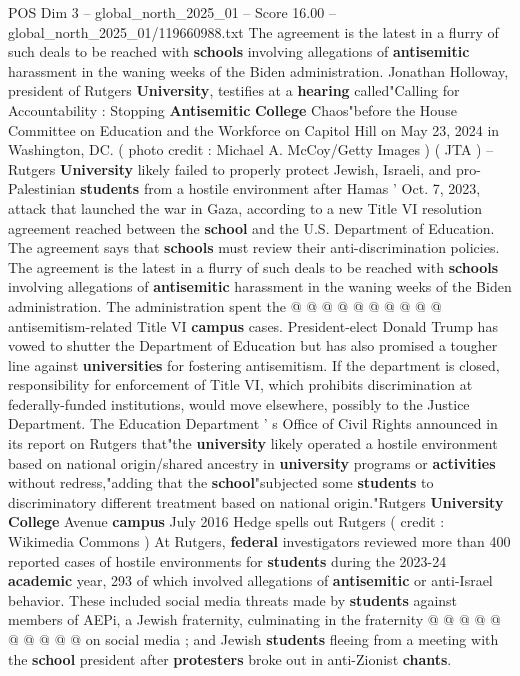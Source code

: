\begin{textsample}{POS Dim 3 – global\_north\_2025\_01 – Score 16.00 – global\_north\_2025\_01/119660988.txt}  \label{ex:f3_pos_244}
The agreement is the latest in a flurry of such deals to be reached with \textbf{schools} involving allegations of \textbf{antisemitic} harassment in the waning weeks of the Biden administration.
Jonathan Holloway, president of Rutgers \textbf{University}, testifies at a \textbf{hearing} called"Calling for Accountability : Stopping \textbf{Antisemitic} \textbf{College} Chaos"before the House Committee on Education and the Workforce on Capitol Hill on May 23, 2024 in Washington, DC. ( photo credit : Michael A.
McCoy/Getty Images ) ( JTA ) -- Rutgers \textbf{University} likely failed to properly protect Jewish, Israeli, and pro-Palestinian \textbf{students} from a hostile environment after Hamas ' Oct. 7, 2023, attack that launched the war in Gaza, according to a new Title VI resolution agreement reached between the \textbf{school} and the U.S.
Department of Education.
The agreement says that \textbf{schools} must review their anti-discrimination policies.
The agreement is the latest in a flurry of such deals to be reached with \textbf{schools} involving allegations of \textbf{antisemitic} harassment in the waning weeks of the Biden administration.
The administration spent the @ @ @ @ @ @ @ @ @ @ antisemitism-related Title VI \textbf{campus} cases.
President-elect Donald Trump has vowed to shutter the Department of Education but has also promised a tougher line against \textbf{universities} for fostering antisemitism.
If the department is closed, responsibility for enforcement of Title VI, which prohibits discrimination at federally-funded institutions, would move elsewhere, possibly to the Justice Department.
The Education Department ' s Office of Civil Rights announced in its report on Rutgers that"the \textbf{university} likely operated a hostile environment based on national origin/shared ancestry in \textbf{university} programs or \textbf{activities} without redress,"adding that the \textbf{school}"subjected some \textbf{students} to discriminatory different treatment based on national origin."Rutgers \textbf{University} \textbf{College} Avenue \textbf{campus} July 2016 Hedge spells out Rutgers ( credit : Wikimedia Commons ) At Rutgers, \textbf{federal} investigators reviewed more than 400 reported cases of hostile environments for \textbf{students} during the 2023-24 \textbf{academic} year, 293 of which involved allegations of \textbf{antisemitic} or anti-Israel behavior.
These included social media threats made by \textbf{students} against members of AEPi, a Jewish fraternity, culminating in the fraternity @ @ @ @ @ @ @ @ @ @ on social media ; and Jewish \textbf{students} fleeing from a meeting with the \textbf{school} president after \textbf{protesters} broke out in anti-Zionist \textbf{chants}.

\end{textsample}
